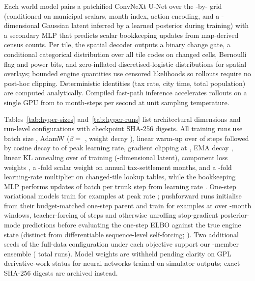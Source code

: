 Each world model pairs a patchified ConvNeXt U-Net \citep{liu2022convnext,ronneberger2015unet} over the \WorldW{}-by-\WorldH{} grid (conditioned on municipal scalars, month index, action encoding, and a \ZDim-dimensional Gaussian latent inferred by a learned posterior during training) with a secondary MLP that predicts scalar bookkeeping updates from map-derived census counts. Per tile, the spatial decoder outputs a binary change gate, a conditional categorical distribution over all \NCodes{} tile codes on changed cells, Bernoulli flag and power bits, and zero-inflated discretised-logistic distributions for spatial overlays; bounded engine quantities use censored likelihoods so rollouts require no post-hoc clipping. Deterministic identities (tax rate, city time, total population) are computed analytically. Compiled fast-path inference accelerates \SizeM{} rollouts on a single GPU from \FastFiftyBefore{} to \FastFiftyAfter{} month-steps per second at unit sampling temperature.

Tables~\ref{tab:hyper-sizes} and~\ref{tab:hyper-runs} list architectural dimensions and run-level configurations with checkpoint SHA-256 digests. All \HpRuns{} training runs use batch size \HpBatch{}, AdamW ($\beta =$ \HpBetas{}, weight decay \HpWd{}), linear warm-up over \HpWarmup{} of steps followed by cosine decay to \HpMinLr{} of peak learning rate, gradient clipping at \HpClip{}, EMA decay \HpEma{}, linear KL annealing over \HpKl{} of training (\HpZ{}-dimensional latent), component loss weights \HpLossWeights{}, a \HpBudgetW{}-fold scalar weight on annual tax-settlement months, and a \HpTableLr{}-fold learning-rate multiplier on changed-tile lookup tables, while the bookkeeping MLP performs \HpBkUpdates{} updates of batch \HpBkBatch{} per trunk step from learning rate \HpBkLr{}. One-step variational models train for \HpSamplesOs{} examples at peak rate \HpLrOs{}; pushforward runs initialise from their budget-matched one-step parent and train for \HpSamplesSf{} examples at \HpLrSf{} over \HpSfK{}-month windows, teacher-forcing \HpSfTf{} of steps and otherwise unrolling stop-gradient posterior-mode predictions before evaluating the one-step ELBO against the true engine state (distinct from differentiable sequence-level self-forcing; \citealp{huang2025selfforcing}). Two additional seeds of the \SizeM{} full-data configuration under each objective support our \DefMembers-member ensemble (\TestRuns{} total runs). Model weights are withheld pending clarity on GPL derivative-work status for neural networks trained on simulator outputs; exact SHA-256 digests are archived instead.


